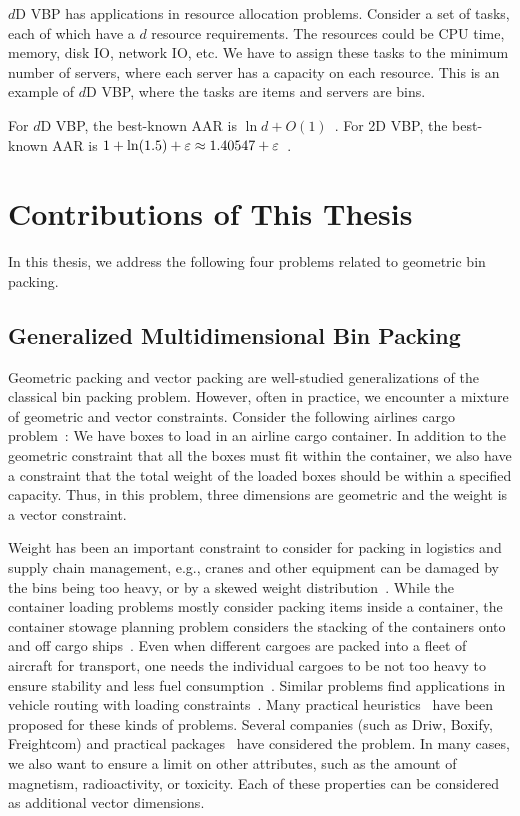 $d$D VBP has applications in resource allocation problems.
Consider a set of tasks, each of which have a $d$ resource requirements.
The resources could be CPU time, memory, disk IO, network IO, etc.
We have to assign these tasks to the minimum number of servers,
where each server has a capacity on each resource.
This is an example of $d$D VBP, where the tasks are items and servers are bins.

For $d$D VBP, the best-known AAR is $\ln d + O(1)$~\cite{rna,bansal2016improved}.
For 2D VBP, the best-known AAR is
$1 + \ln(1.5) + \varepsilon \approx 1.40547 + \varepsilon$~\cite{bansal2016improved}.

\section{Contributions of This Thesis}

In this thesis, we address the following four problems related to geometric bin packing.

\subsection{Generalized Multidimensional Bin Packing}
\label{sec:intro:gvbp}

Geometric packing and vector packing are well-studied generalizations of
the classical bin packing problem.
However, often in practice, we encounter a mixture of geometric and vector constraints.
Consider the following airlines cargo problem~\cite{paquay2016mixed}:
We have boxes to load in an airline cargo container.
In addition to the geometric constraint that all the boxes must fit within the container,
we also have a constraint that the total weight of the loaded boxes
should be within a specified capacity. Thus, in this problem,
three dimensions are geometric and the weight is a vector constraint.

Weight has been an important constraint to consider for packing in logistics and supply chain
management, e.g., cranes and other equipment can be damaged by the bins being too heavy,
or by a skewed weight distribution~\cite{alonso2017mathematical}.
While the container loading problems mostly consider packing items inside a container,
the container stowage planning problem considers the stacking of the containers
onto and off cargo ships~\cite{monaco2014terminal}.
Even when different cargoes are packed into a fleet of aircraft for transport,
one needs the individual cargoes to be not too heavy to ensure stability
and less fuel consumption~\cite{amiouny1992balanced}.
Similar problems find applications in vehicle routing
with loading constraints~\cite{bortfeldt2013constraints}.
Many practical heuristics~\cite{sorset2019heuristic,taylor2017three}
have been proposed for these kinds of problems.
Several companies (such as Driw, Boxify, Freightcom) and practical packages~\cite{yang2017gbp}
have considered the problem. In many cases, we also want to ensure a limit on other attributes,
such as the amount of magnetism, radioactivity, or toxicity.
Each of these properties can be considered as additional vector dimensions.

